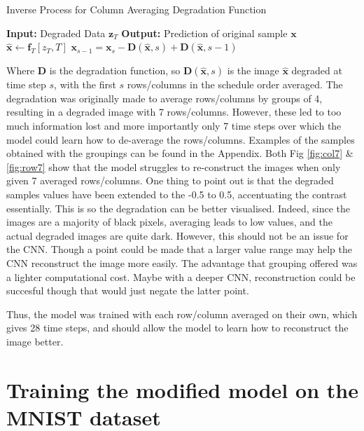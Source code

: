 \documentclass[12pt]{report} %
\begin{document}
\begin{definitionbox}{Inverse Process for Column Averaging Degradation Function}
  \begin{algorithmic}[1]
    \State \textbf{Input:} Degraded Data $\mathbf{z}_{T}$
    \State \textbf{Output:} Prediction of original sample $\mathbf{x}$
       
        \State $\hat{\mathbf{x}} \gets \mathbf{f}_{T}[z_{T}, T]$ 
        \State $\mathbf{x}_{s-1} = \mathbf{x}_{s} - \mathbf{D}(\hat{\mathbf{x}}, s) + \mathbf{D}(\hat{\mathbf{x}}, s-1)$ 
      \EndFor
  \end{algorithmic}
\end{definitionbox}

Where $\mathbf{D}$ is the degradation function, so $\mathbf{D}(\hat{\mathbf{x}}, s)$ is the image $\hat{\mathbf{x}}$ degraded at time step $s$, with the first $s$ rows/columns in the schedule order averaged. The degradation was originally made to average rows/columns by groups of 4, resulting in a degraded image with 7 rows/columns. However, these led to too much information lost and more importantly only 7 time steps over which the model could learn how to de-average the rows/columns. Examples of the samples obtained with the groupings can be found in the Appendix. Both Fig \ref{fig:col7} \& \ref{fig:row7} show that the model struggles to re-construct the images when only given 7 averaged rows/columns. One thing to point out is that the degraded samples values have been extended to the -0.5 to 0.5, accentuating the contrast essentially. This is so the degradation can be better visualised. Indeed, since the images are a majority of black pixels, averaging leads to low values, and the actual degraded images are quite dark. However, this should not be an issue for the CNN. Though a point could be made that a larger value range may help the CNN reconstruct the image more easily. The advantage that grouping offered was a lighter computational cost. Maybe with a deeper CNN, reconstruction could be succesful though that would just negate the latter point.

Thus, the model was trained with each row/column averaged on their own, which gives 28 time steps, and should allow the model to learn how to reconstruct the image better.


\section{Training the modified model on the MNIST dataset}
\end{document}
